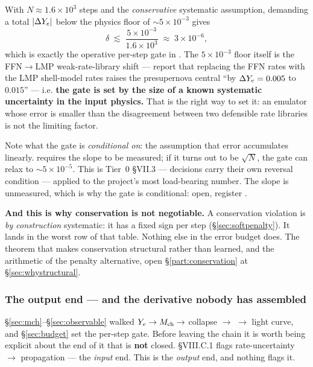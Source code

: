 With $N \approx 1.6\times10^{3}$ steps and the \emph{conservative} systematic
assumption, demanding a total $|\Delta Y_{e}|$ below the physics floor of
${\sim}5\times10^{-3}$ gives
%
\begin{equation}
\delta \;\lesssim\; \frac{5\times10^{-3}}{1.6\times10^{3}}
        \;\approx\; 3\times10^{-6},
\label{eq:pergate}
\end{equation}
%
which is exactly the operative per-step gate in . The
$5\times10^{-3}$ floor itself is the FFN$\to$LMP weak-rate-library shift ---
\citet{heger2001} report that replacing the FFN rates \citep{ffn1980, ffn1985}
with the LMP shell-model rates \citep{lmp2000} raises the presupernova central
\Ye{} ``by $\Delta Y_{e} = 0.005$ to $0.015$'' --- i.e. \textbf{the gate is set by the
size of a known systematic uncertainty in the input physics.} That is the right
way to set it: an emulator whose error is smaller than the disagreement between
two defensible rate libraries is not the limiting factor.

Note what the gate is \emph{conditional on}: the assumption that error
accumulates linearly.  requires the slope to be
measured; if it turns out to be $\sqrt N$, the gate can relax to
${\sim}5\times10^{-5}$. This is Tier~0 \S VII.3 --- decisions carry their own
reversal condition --- applied to the project's most load-bearing number. The
slope is unmeasured, which is why the gate is conditional: open, register
.

\begin{invariant}
\textbf{And this is why conservation is not negotiable.} A conservation
violation is \emph{by construction} systematic: it has a fixed sign per step
(\S\ref{sec:softpenalty}). It lands in the worst row of that table. Nothing else
in the error budget does. The theorem that makes conservation structural rather
than learned, and the arithmetic of the penalty alternative, open
\S\ref{part:conservation} at \S\ref{sec:whystructural}.
\end{invariant}

\subsubsection{The output end --- and the derivative nobody has assembled}
\label{sec:outputend}

\S\ref{sec:mch}--\S\ref{sec:observable} walked $Y_{e} \to M_{\mathrm{ch}} \to$ collapse $\to$
 $\to$ light curve, and \S\ref{sec:budget} set the per-step gate.
Before leaving the chain it is worth being explicit about the end of it that is
\textbf{not} closed.  \S VIII.C.1 flags rate-uncertainty $\to$
\Ye{} propagation --- the \emph{input} end. This is the \emph{output} end, and
nothing flags it.


